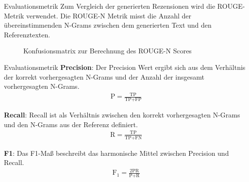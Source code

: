 
\begin{frame}[fragile]{Evaluationsmetrik}
  Zum Vergleich der generierten Rezensionen wird die ROUGE-Metrik verwendet.
  Die ROUGE-N Metrik misst die Anzahl der übereinstimmenden N-Grams zwischen dem generierten Text und den Referenztexten. 
  \begin{figure}[h!]
    \centering
{}
\caption{Konfusionsmatrix zur Berechnung des ROUGE-N Scores}
\end{figure}
\end{frame}


\begin{frame}{Evaluationsmetrik}
      \textbf{Precision}: 
      Der Precision Wert ergibt sich aus dem Verhältnis der korrekt vorhergesagten N-Grams und der Anzahl der insgesamt vorhergesagten N-Grams.
      \begin{align*}
      \text{P} = \frac{\text{TP}}{\text{TP}+\text{FP}}
      \end{align*}
  
      \textbf{Recall}:
      Recall ist als Verhältnis zwischen den korrekt vorhergesagten N-Grams und den N-Grams aus der Referenz definiert.
      \begin{align*}
      \text{R} = \frac{\text{TP}}{\text{TP}+\text{FN}}
      \end{align*}
  
      \textbf{F1}:
      Das F1-Maß beschreibt das harmonische Mittel zwischen Precision und Recall.
      \begin{align*}
      \text{F}_\text{1} = \frac{2\text{PR}}{\text{P}+\text{R}}
      \end{align*}
\end{frame}

